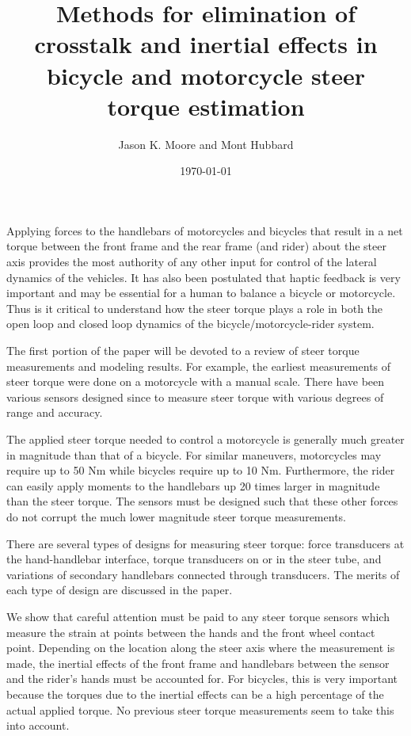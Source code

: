 \documentclass[a4paper]{article}
\title{Methods for elimination of crosstalk and inertial effects in bicycle and motorcycle steer torque estimation}
\author{Jason K. Moore and Mont Hubbard}
\date{\today}
\begin{document}
\maketitle

Applying forces to the handlebars of motorcycles and bicycles that result in a
net torque between the front frame and the rear frame (and rider) about the
steer axis provides the most authority of any other input for control of the
lateral dynamics of the vehicles. It has also been postulated that haptic
feedback is very important and may be essential for a human to balance a
bicycle or motorcycle.  Thus is it critical to understand how the steer torque
plays a role in both the open loop and closed loop dynamics of the
bicycle/motorcycle-rider system.

The first portion of the paper will be devoted to a review of steer torque
measurements and modeling results. For example, the earliest measurements of
steer torque were done on a motorcycle \cite{Wilson-Jones1951} with a manual
scale. There have been various sensors designed since to measure steer torque
with various degrees of range and accuracy.

The applied steer torque needed to control a motorcycle is generally much
greater in magnitude than that of a bicycle. For similar maneuvers, motorcycles
may require up to 50 Nm while bicycles require up to 10 Nm. Furthermore, the
rider can easily apply moments to the handlebars up 20 times larger in
magnitude than the steer torque. The sensors must be designed such that these
other forces do not corrupt the much lower magnitude steer torque measurements.

There are several types of designs for measuring steer torque: force
transducers at the hand-handlebar interface, torque transducers on or in the
steer tube, and variations of secondary handlebars connected through
transducers. The merits of each type of design are discussed in the paper.

We show that careful attention must be paid to any steer torque sensors which
measure the strain at points between the hands and the front wheel contact
point.  Depending on the location along the steer axis where the measurement is
made, the inertial effects of the front frame and handlebars between the sensor
and the rider's hands must be accounted for. For bicycles, this is very
important because the torques due to the inertial effects can be a high
percentage of the actual applied torque. No previous steer torque measurements
seem to take this into account.
\end{document}
